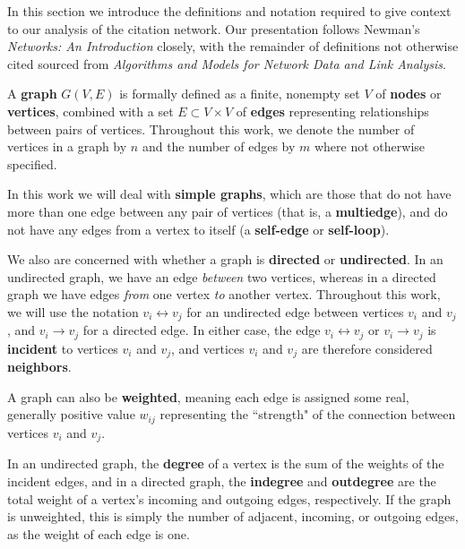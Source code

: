 \documentclass[12pt]{thesis}
\theoremstyle{plain}
\theoremstyle{definition}
\theoremstyle{remark}
\begin{document}
In this section we introduce the definitions and notation required to give context to our analysis of the citation network. Our presentation follows Newman's \textit{Networks: An Introduction} closely, with the remainder of definitions not otherwise cited sourced from \textit{Algorithms and Models for Network Data and Link Analysis}. %

A \textbf{graph} $G(V,E)$ is formally defined as a finite, nonempty set $V$ of \textbf{nodes} or \textbf{vertices}, combined with a set $E\subset V\times V$ of \textbf{edges} representing relationships between pairs of vertices. Throughout this work, we denote the number of vertices in a graph by $n$ and the number of edges by $m$ where not otherwise specified.

In this work we will deal with \textbf{simple graphs}, which are those that do not have more than one edge between any pair of vertices (that is, a \textbf{multiedge}), and do not have any edges from a vertex to itself (a \textbf{self-edge} or \textbf{self-loop}). 

We also are concerned with whether a graph is \textbf{directed} or \textbf{undirected}. In an undirected graph, we have an edge \textit{between} two vertices, whereas in a directed graph we have edges \textit{from} one vertex \textit{to} another vertex. Throughout this work, we will use the notation $v_i \leftrightarrow v_j$ for an undirected edge between vertices $v_i$ and $v_j$, and $v_i \rightarrow v_j$ for a directed edge. In either case, the edge $v_i\leftrightarrow v_j$ or $v_i\rightarrow v_j$ is \textbf{incident} to vertices $v_i$ and $v_j$, and vertices $v_i$ and $v_j$ are therefore considered \textbf{neighbors}.

A graph can also be \textbf{weighted}, meaning each edge is assigned some real, generally positive value $w_{ij}$ representing the ``strength" of the connection between vertices $v_i$ and $v_j$. 

In an undirected graph, the \textbf{degree} of a vertex is the sum of the weights of the incident edges, and in a directed graph, the \textbf{indegree} and \textbf{outdegree} are the total weight of a vertex's incoming and outgoing edges, respectively. If the graph is unweighted, this is simply the number of adjacent, incoming, or outgoing edges, as the weight of each edge is one.
\end{document}
